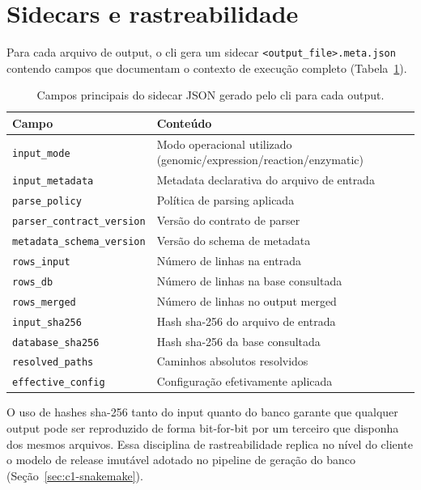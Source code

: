 \section{Sidecars e rastreabilidade}
\label{sec:c4-sidecars}

Para cada arquivo de output, o \gls{cli} gera um sidecar \texttt{<output\_file>.meta.json} contendo campos que documentam o contexto de execução completo (Tabela~\ref{tab:c4-sidecar}).

\begin{table}[htbp]
\centering
\caption{Campos principais do sidecar JSON gerado pelo \gls{cli} \biorempp{} para cada output.}
\label{tab:c4-sidecar}
\small
\begin{tabular}{@{}lp{7cm}@{}}
\toprule
\textbf{Campo} & \textbf{Conteúdo} \\
\midrule
\texttt{input\_mode}            & Modo operacional utilizado (genomic/expression/reaction/enzymatic) \\
\texttt{input\_metadata}        & Metadata declarativa do arquivo de entrada \\
\texttt{parse\_policy}          & Política de parsing aplicada \\
\texttt{parser\_contract\_version}     & Versão do contrato de parser \\
\texttt{metadata\_schema\_version}     & Versão do schema de metadata \\
\texttt{rows\_input}            & Número de linhas na entrada \\
\texttt{rows\_db}               & Número de linhas na base consultada \\
\texttt{rows\_merged}           & Número de linhas no output merged \\
\texttt{input\_sha256}          & Hash \gls{sha}-256 do arquivo de entrada \\
\texttt{database\_sha256}       & Hash \gls{sha}-256 da base consultada \\
\texttt{resolved\_paths}        & Caminhos absolutos resolvidos \\
\texttt{effective\_config}      & Configuração efetivamente aplicada \\
\bottomrule
\end{tabular}
\end{table}

O uso de hashes \gls{sha}-256 tanto do input quanto do banco garante que qualquer output pode ser reproduzido de forma bit-for-bit por um terceiro que disponha dos mesmos arquivos. Essa disciplina de rastreabilidade replica no nível do cliente o modelo de release imutável adotado no pipeline de geração do banco (Seção~\ref{sec:c1-snakemake}).

